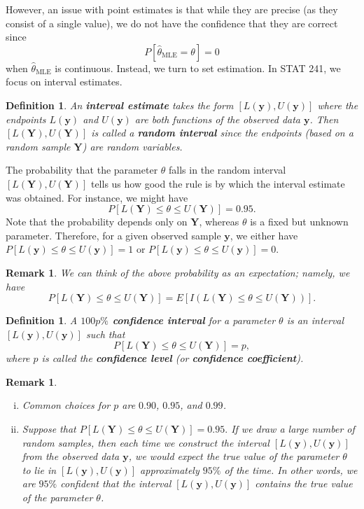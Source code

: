 \documentclass[10pt]{article}
\DeclareMathOperator{\MLE}{MLE}
\theoremstyle{newstyle}
\newtheorem{remark}[thm]{Remark}
\newtheorem{defn}[thm]{Definition}
\begin{document}
However, an issue with point estimates is that while they are precise (as they consist of a 
single value), we do not have the confidence that they are correct since 
\[ P[\hat\theta_{\MLE} = \theta] = 0 \] 
when $\hat\theta_{\MLE}$ is continuous. Instead, we turn to set estimation. 
In STAT 241, we focus on interval estimates. 

\begin{defn}
An {\bf interval estimate} takes the form $[L(\mathbf y), U(\mathbf y)]$ where 
the endpoints $L(\mathbf y)$ and $U(\mathbf y)$ are both functions of the observed data 
$\mathbf y$. Then $[L(\mathbf Y), U(\mathbf Y)]$ is called a {\bf random interval} 
since the endpoints (based on a random sample $\mathbf Y$) are random variables.
\end{defn}

The probability that the parameter $\theta$ falls in the random interval 
$[L(\mathbf Y), U(\mathbf Y)]$ tells us how good the rule is by which the interval 
estimate was obtained. For instance, we might have 
\[ P[L(\mathbf Y) \leq \theta \leq U(\mathbf Y)] = 0.95. \]
Note that the probability depends only on $\mathbf Y$, whereas $\theta$ is a fixed but 
unknown parameter. Therefore, for a given observed sample $\mathbf y$, we either have 
$P[L(\mathbf y) \leq \theta \leq U(\mathbf y)] = 1$ or 
$P[L(\mathbf y) \leq \theta \leq U(\mathbf y)] = 0$.

\begin{remark}
We can think of the above probability as an expectation; namely, we have 
\[ P[L(\mathbf Y) \leq \theta \leq U(\mathbf Y)] = E[I(L(\mathbf Y) \leq \theta \leq 
U(\mathbf Y))]. \]
\end{remark}

\begin{defn}
A {\bf $100p\%$ confidence interval} for a parameter $\theta$ is an interval 
$[L(\mathbf y), U(\mathbf y)]$ such that 
\[ P[L(\mathbf Y) \leq \theta \leq U(\mathbf Y)] = p, \]
where $p$ is called the {\bf confidence level} (or {\bf confidence coefficient}). 
\end{defn}

\begin{remark}~
\begin{enumerate}[(i)]
    \item Common choices for $p$ are $0.90$, $0.95$, and $0.99$. 
    \item Suppose that $P[L(\mathbf Y) \leq \theta \leq U(\mathbf Y)] = 0.95.$ 
    If we draw a large number of random samples, then each time we construct the 
    interval $[L(\mathbf y), U(\mathbf y)]$ from the observed data $\mathbf y$, 
    we would expect the true value of the parameter $\theta$ to lie in 
    $[L(\mathbf y), U(\mathbf y)]$ approximately $95\%$ of the time. In other words, 
    we are $95\%$ confident that the interval $[L(\mathbf y), U(\mathbf y)]$ contains 
    the true value of the parameter $\theta$. 
\end{enumerate}
\end{remark}
\end{document}

